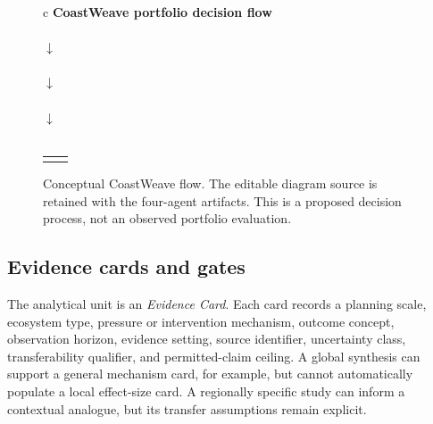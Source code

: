 \documentclass[conference]{IEEEtran}
\begin{document}
\begin{figure}[t]
\centering
\footnotesize
\begin{tabular}{c}
\textbf{CoastWeave portfolio decision flow}\\[2pt]
\\[3pt]
$\downarrow$\\[-1pt]
\\[3pt]
$\downarrow$\\[-1pt]
\\[3pt]
$\downarrow$\\[-1pt]
\\[3pt]
\begin{tabular}{c@{\qquad}c}
\fbox{\parbox{0.36\columnwidth}{\centering Fail or unknown\\Blocked or evidence-abstention state}} &
\fbox{\parbox{0.36\columnwidth}{\centering Pass with sensitivity analysis\\Conditional portfolio-readiness result}}
\end{tabular}
\end{tabular}
\caption{Conceptual CoastWeave flow. The editable diagram source is retained with the four-agent artifacts. This is a proposed decision process, not an observed portfolio evaluation.}
\label{fig:coastweave}
\end{figure}

\subsection{Evidence cards and gates}

The analytical unit is an \emph{Evidence Card}. Each card records a planning scale, ecosystem type, pressure or intervention mechanism, outcome concept, observation horizon, evidence setting, source identifier, uncertainty class, transferability qualifier, and permitted-claim ceiling. A global synthesis can support a general mechanism card, for example, but cannot automatically populate a local effect-size card. A regionally specific study can inform a contextual analogue, but its transfer assumptions remain explicit.
\end{document}
